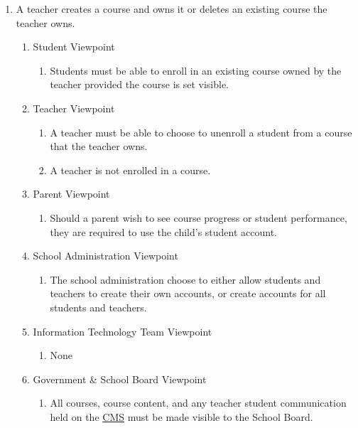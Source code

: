 \documentclass[]{article}
\begin{document}

\begin{enumerate}[{BE}1.]
	\item A teacher creates a course and owns it or deletes an existing course the teacher owns.
	\begin{enumerate}[{VP1}.1]
		\item Student Viewpoint
			\begin{enumerate}
				\item Students must be able to enroll in an existing course owned by the teacher provided the course is set visible.
			\end{enumerate}
		\item Teacher Viewpoint
			\begin{enumerate}
				\item A teacher must be able to choose to unenroll a student from a course that the teacher owns.
				\item A teacher is not enrolled in a course.
			\end{enumerate}
		\item Parent Viewpoint
			\begin{enumerate}
				\item \*\*\*\*\* Should a parent wish to see course progress or student performance, they are required to use the child's student account.
			\end{enumerate}
		\item School Administration Viewpoint
			\begin{enumerate}
				\item The school administration  choose to either allow students and teachers to create their own accounts, or create accounts for all students and teachers.
			\end{enumerate}
		\item Information Technology Team Viewpoint
			\begin{enumerate}
				\item None
			\end{enumerate}
		\item Government \& School Board Viewpoint
			\begin{enumerate}
				\item All courses, course content, and any teacher student communication
          held on the \underline{CMS} must be made visible to the School Board.
			\end{enumerate}
	\end{enumerate}


\end{enumerate}
\end{document}
